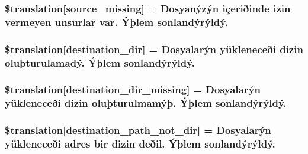 \subsubsection[{\$translation}]{\setlength{\rightskip}{0pt plus 5cm}\$translation\mbox{[}\textquotesingle{}source\+\_\+missing\textquotesingle{}\mbox{]} = \textquotesingle{}Dosyanýzýn içeriðinde izin vermeyen unsurlar var. Ýþlem sonlandýrýldý.\textquotesingle{}}\label{class_8upload_8tr___t_r_8php_aceaaf7355acaaf10f0ae60378d03c468}
\hypertarget{class_8upload_8tr___t_r_8php_aff2427c72a2598aefa6d58df1dd18b08}{}
\subsubsection[{\$translation}]{\setlength{\rightskip}{0pt plus 5cm}\$translation\mbox{[}\textquotesingle{}destination\+\_\+dir\textquotesingle{}\mbox{]} = \textquotesingle{}Dosyalarýn yükleneceði dizin oluþturulamadý. Ýþlem sonlandýrýldý.\textquotesingle{}}\label{class_8upload_8tr___t_r_8php_aff2427c72a2598aefa6d58df1dd18b08}
\hypertarget{class_8upload_8tr___t_r_8php_a9ef28d3cf09942c6c0a1e77fa09185e8}{}
\subsubsection[{\$translation}]{\setlength{\rightskip}{0pt plus 5cm}\$translation\mbox{[}\textquotesingle{}destination\+\_\+dir\+\_\+missing\textquotesingle{}\mbox{]} = \textquotesingle{}Dosyalarýn yükleneceði dizin oluþturulmamýþ. Ýþlem sonlandýrýldý.\textquotesingle{}}\label{class_8upload_8tr___t_r_8php_a9ef28d3cf09942c6c0a1e77fa09185e8}
\hypertarget{class_8upload_8tr___t_r_8php_a5704a67137126e8c87b7a364175929d4}{}
\subsubsection[{\$translation}]{\setlength{\rightskip}{0pt plus 5cm}\$translation\mbox{[}\textquotesingle{}destination\+\_\+path\+\_\+not\+\_\+dir\textquotesingle{}\mbox{]} = \textquotesingle{}Dosyalarýn yükleneceði adres bir dizin deðil. Ýþlem sonlandýrýldý.\textquotesingle{}}\label{class_8upload_8tr___t_r_8php_a5704a67137126e8c87b7a364175929d4}
\hypertarget{class_8upload_8tr___t_r_8php_a97608ea194a616db49141a0e6dee900c}{}
